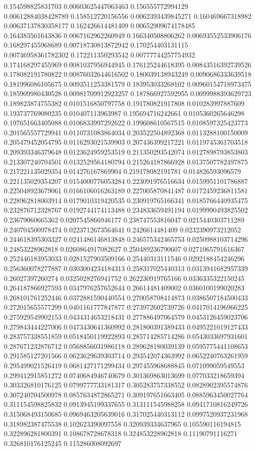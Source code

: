\begin{table}
\begin{tabu}
\begin{sparkline}{10}
0.154598825831703 0.00603625447063463 0.156555772994129 0.00612884038428789 0.158512720156556 0.0062393439845271 0.160469667318982 0.00637137830358177 0.162426614481409 0.00652909674178485 0.164383561643836 0.0067162962260949 0.166340508806262 0.00693552533906176 0.168297455968689 0.00718730813872942 0.170254403131115 0.00746958361782302 0.172211350293542 0.00777744257754932 0.174168297455969 0.0081037956944945 0.176125244618395 0.00843516392739526 0.178082191780822 0.00876032644616502 0.180039138943249 0.0090686333639518 0.181996086105675 0.0093511253381579 0.183953033268102 0.00960154718973475 0.185909980430528 0.00981709912923257 0.187866927592955 0.0099988393629723 0.189823874755382 0.0101516850797758 0.191780821917808 0.010283997887609 0.193737769080235 0.010407113963987 0.195694716242661 0.0105360265646298 0.197651663405088 0.0106833997292622 0.199608610567515 0.0108597325423773 0.201565557729941 0.0110731083864034 0.203522504892368 0.0113288100150009 0.205479452054795 0.0116293021539903 0.207436399217221 0.0119745361703518 0.209393346379648 0.0123624959253519 0.211350293542074 0.0127898793853803 0.213307240704501 0.0132529564180794 0.215264187866928 0.0137507782497875 0.217221135029354 0.014276167869904 0.219178082191781 0.014826593096579 0.221135029354207 0.0154000776053284 0.223091976516634 0.0159951101786887 0.225048923679061 0.0166106016263189 0.227005870841487 0.0172459236811581 0.228962818003914 0.0179010319420535 0.230919765166341 0.0185766440935475 0.232876712328767 0.0192744174113488 0.234833659491194 0.0199990493825502 0.23679060665362 0.0207545866946177 0.238747553816047 0.0215440303711289 0.240704500978474 0.0223712673564641 0.2426614481409 0.0232390973212052 0.244618395303327 0.0241486146813848 0.246575342465753 0.0250988103714296 0.24853228962818 0.0260864917082627 0.250489236790607 0.0271065791616367 0.252446183953033 0.0281527903509166 0.25440313111546 0.0292188454246296 0.256360078277887 0.0303004234184313 0.258317025440313 0.0313941682957339 0.26027397260274 0.0325028276941752 0.262230919765166 0.0336335322150245 0.264187866927593 0.0347976257652644 0.26614481409002 0.0360100199020283 0.268101761252446 0.0372881590440554 0.270058708414873 0.0386507184500433 0.272015655577299 0.0401161777847877 0.273972602739726 0.0417014196966225 0.275929549902153 0.0434314653218431 0.277886497064579 0.0453126459023706 0.279843444227006 0.0473430641360992 0.281800391389433 0.0495221019127433 0.283757338551859 0.0518450119922893 0.285714285714286 0.0543033697931601 0.287671232876712 0.0568856031986118 0.289628180039139 0.0595775441108653 0.291585127201566 0.0623629639303714 0.293542074363992 0.0652240763261959 0.295499021526419 0.0681427171299434 0.297455968688845 0.071099059549553 0.299412915851272 0.0740684946740679 0.301369863013699 0.077033218659394 0.303326810176125 0.0799777733181317 0.305283757338552 0.0828902395574876 0.307240704500978 0.0857634872865271 0.309197651663405 0.0885963450027764 0.311154598825832 0.0913945199337655 0.313111545988258 0.0941710816249726 0.315068493150685 0.0969463205639016 0.317025440313112 0.0997520937231968 0.318982387475538 0.102623390097558 0.320939334637965 0.105590116194815 0.322896281800391 0.108678728678318 0.324853228962818 0.11190791116271 0.326810176125245 0.115286008092697 
\end{sparkline}
\end{tabu}
\end{table}
